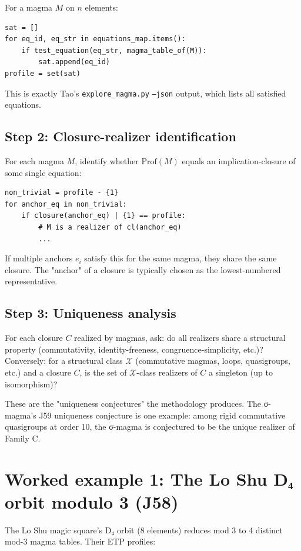 \documentclass[11pt,reqno]{amsart}
\theoremstyle{plain}
\theoremstyle{definition}
\begin{document}
For a magma $M$ on $n$ elements:
\begin{verbatim}
sat = []
for eq_id, eq_str in equations_map.items():
    if test_equation(eq_str, magma_table_of(M)):
        sat.append(eq_id)
profile = set(sat)
\end{verbatim}

This is exactly Tao's \texttt{explore_magma.py} \texttt{--json} output, which lists all satisfied equations.

\subsection{Step 2: Closure-realizer identification}

For each magma $M$, identify whether $\mathrm{Prof}(M)$ equals an implication-closure of some single equation:
\begin{verbatim}
non_trivial = profile - {1}
for anchor_eq in non_trivial:
    if closure(anchor_eq) | {1} == profile:
        # M is a realizer of cl(anchor_eq)
        ...
\end{verbatim}

If multiple anchors $e_i$ satisfy this for the same magma, they share the same closure. The "anchor" of a closure is typically chosen as the lowest-numbered representative.

\subsection{Step 3: Uniqueness analysis}

For each closure $C$ realized by magmas, ask: do all realizers share a structural property (commutativity, identity-freeness, congruence-simplicity, etc.)? Conversely: for a structural class $\mathcal{X}$ (commutative magmas, loops, quasigroups, etc.) and a closure $C$, is the set of $\mathcal{X}$-class realizers of $C$ a singleton (up to isomorphism)?

These are the "uniqueness conjectures" the methodology produces. The σ-magma's J59 uniqueness conjecture is one example: among rigid commutative quasigroups at order 10, the σ-magma is conjectured to be the unique realizer of Family C.

\section{Worked example 1: The Lo Shu D₄ orbit modulo 3 (J58)}

The Lo Shu magic square's D₄ orbit (8 elements) reduces mod 3 to 4 distinct mod-3 magma tables. Their ETP profiles:
\end{document}
